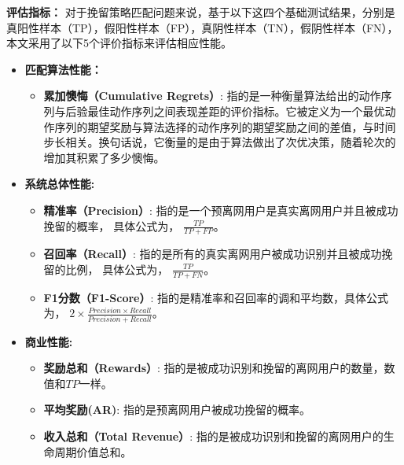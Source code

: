 \textbf{评估指标：}
对于挽留策略匹配问题来说，基于以下这四个基础测试结果，分别是真阳性样本（TP），假阳性样本（FP），真阴性样本（TN），假阴性样本（FN），本文采用了以下5个评价指标来评估相应性能。
\begin{itemize}
	\item \textbf{匹配算法性能：}
	
	\begin{itemize}
		\item \textbf{累加懊悔（Cumulative Regrets）}: 指的是一种衡量算法给出的动作序列与后验最佳动作序列之间表现差距的评价指标。它被定义为一个最优动作序列的期望奖励与算法选择的动作序列的期望奖励之间的差值，与时间步长相关。换句话说，它衡量的是由于算法做出了次优决策，随着轮次的增加其积累了多少懊悔。
		
	\end{itemize}
	
	\item \textbf{系统总体性能:}
	\begin{itemize}
		
		\item \textbf{精准率（Precision）}: 指的是一个预离网用户是真实离网用户并且被成功挽留的概率， 具体公式为， $\frac{TP}{TP+FP}$。
		
		\item \textbf{召回率（Recall）}: 指的是所有的真实离网用户被成功识别并且被成功挽留的比例， 具体公式为， $\frac{TP}{TP+FN}$。
		
		\item \textbf{F1分数（F1-Score）}: 指的是精准率和召回率的调和平均数，具体公式为， $2 \times \frac{Precision \times Recall}{Precision + Recall}$。
	\end{itemize}
	
	\item \textbf{商业性能:}
	\begin{itemize}
		\item \textbf{奖励总和（Rewards）}: 指的是被成功识别和挽留的离网用户的数量，数值和$TP$一样。
		
		\item \textbf{平均奖励(AR)}: 指的是预离网用户被成功挽留的概率。
		
		\item \textbf{收入总和（Total Revenue）}: 指的是被成功识别和挽留的离网用户的生命周期价值总和。
	\end{itemize}
	
\end{itemize}

